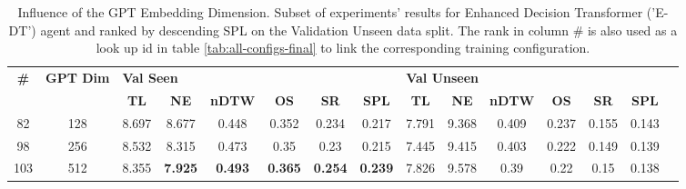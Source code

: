 \begin{table}
\centering
\caption{\label{tab:e_dt_dim_test}Influence of the GPT Embedding Dimension. Subset of experiments' results for Enhanced Decision Transformer ('E-DT') agent and ranked by descending SPL on the Validation Unseen data split. The rank in column \# is also used as a look up id in table \ref{tab:all-configs-final} to link the corresponding training configuration.}
\begin{tabular}{@{\hskip3pt}c@{\hskip3pt}c@{\hskip3pt}c@{\hskip3pt}c@{\hskip3pt}c@{\hskip3pt}c@{\hskip3pt}c@{\hskip3pt}c@{\hskip3pt}c@{\hskip3pt}c@{\hskip3pt}c@{\hskip3pt}c@{\hskip3pt}c@{\hskip3pt}c@{\hskip3pt}c}
\toprule
\textbf{\#} & \textbf{GPT Dim} & \multicolumn{6}{l}{\textbf{Val Seen}} & \multicolumn{6}{l}{\textbf{Val Unseen}} \\
 \textbf{~} &       \textbf{~} &       \textbf{TL} &     \textbf{NE} &   \textbf{nDTW} &     \textbf{OS} &     \textbf{SR} &    \textbf{SPL} &         \textbf{TL} & \textbf{NE} & \textbf{nDTW} & \textbf{OS} & \textbf{SR} & \textbf{SPL} \\
\midrule
         82 &              128 &             8.697 &           8.677 &           0.448 &           0.352 &           0.234 &           0.217 &               7.791 &       9.368 &         0.409 &       0.237 &       0.155 &        0.143 \\
         98 &              256 &             8.532 &           8.315 &           0.473 &            0.35 &            0.23 &           0.215 &               7.445 &       9.415 &         0.403 &       0.222 &       0.149 &        0.139 \\
        103 &              512 &             8.355 &  \textbf{7.925} &  \textbf{0.493} &  \textbf{0.365} &  \textbf{0.254} &  \textbf{0.239} &               7.826 &       9.578 &          0.39 &        0.22 &        0.15 &        0.138 \\
\bottomrule
\end{tabular}
\end{table}
